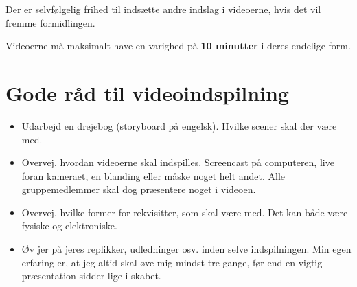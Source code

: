 \documentclass[a4paper, 12pt]{article}
\begin{document}
Der er selvfølgelig frihed til indsætte andre indslag i videoerne, hvis det vil fremme formidlingen.

Videoerne må maksimalt have en varighed på \textbf{10 minutter} i deres endelige form.

\section*{Gode råd til videoindspilning}
\label{sec:orgf7d70f6}
\begin{itemize}
\item Udarbejd en drejebog (storyboard på engelsk). Hvilke scener skal der være med.
\item Overvej, hvordan videoerne skal indspilles. Screencast på computeren, live foran kameraet, en blanding eller måske noget helt andet. Alle gruppemedlemmer skal dog præsentere noget i videoen.
\item Overvej, hvilke former for rekvisitter, som skal være med. Det kan både være fysiske og elektroniske.
\item Øv jer på jeres replikker, udledninger osv. inden selve indspilningen. Min egen erfaring er, at jeg altid skal øve mig mindst tre gange, før end en vigtig præsentation sidder lige i skabet.
\end{itemize}
\end{document}
